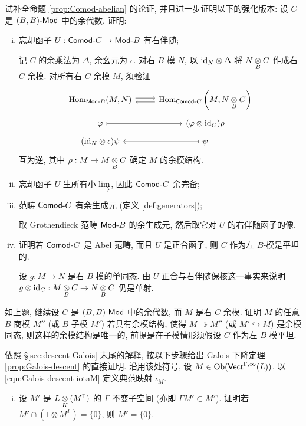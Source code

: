 \begin{Exercises}
	\item 试补全命题 \ref{prop:Comod-abelian} 的论证, 并且进一步证明以下的强化版本: 设 $C$ 是 $(B, B)\text{-}\mathsf{Mod}$ 中的余代数, 证明:
	\begin{enumerate}[(i)]
		\item 忘却函子 $U: \mathsf{Comod}\text{-}C \to \mathsf{Mod}\text{-}B$ 有右伴随;
		
		\begin{hint}
			记 $C$ 的余乘法为 $\Delta$, 余幺元为 $\epsilon$. 对右 $B$-模 $N$, 以 $\mathrm{id}_N \otimes \Delta$ 将 $N \underset{B}{\otimes} C$ 作成右 $C$-余模. 对所有右 $C$-余模 $M$, 须验证
			\[\begin{tikzcd}[row sep=tiny]
				\Hom_{\cated{Mod}B}(M, N) \arrow[shift left, r] & \Hom_{\cated{Comod}C}\left(M, N \dotimes{B} C\right) \arrow[shift left, l] \\
				\varphi \arrow[mapsto, r] & (\varphi \otimes \identity_C) \rho \\
				(\identity_N \otimes \epsilon) \psi & \psi \arrow[mapsto, l]
			\end{tikzcd}\]
			互为逆, 其中 $\rho: M \to M \underset{B}{\otimes} C$ 确定 $M$ 的余模结构.
		\end{hint}
		\item 忘却函子 $U$ 生所有小 $\varinjlim$, 因此 $\mathsf{Comod}\text{-}C$ 余完备;
		\item 范畴 $\mathsf{Comod}\text{-}C$ 有余生成元 (定义 \ref{def:generators});
		
		\begin{hint}
			取 Grothendieck 范畴 $\mathsf{Mod}\text{-}B$ 的余生成元, 然后取它对
			$U$ 的右伴随函子的像.
		\end{hint}
		\item 证明若 $\mathsf{Comod}\text{-}C$ 是 Abel 范畴, 而且 $U$ 是正合函子, 则 $C$ 作为左 $B$-模是平坦的.
		
		\begin{hint}
			设 $g: M \to N$ 是右 $B$-模的单同态. 由 $U$ 正合与右伴随保核这一事实来说明 $g \otimes \mathrm{id}_C: M \underset{B}{\otimes} C \to N \underset{B}{\otimes} C$ 仍是单射.
		\end{hint}
	\end{enumerate}

	\item 如上题, 继续设 $C$ 是 $(B, B)\text{-}\mathsf{Mod}$ 中的余代数, 而 $M$ 是右 $C$-余模. 证明 $M$ 的任意 $B$-商模 $M''$ (或 $B$-子模 $M'$) 若具有余模结构, 使得 $M \twoheadrightarrow M''$ (或 $M' \hookrightarrow M$) 是余模同态, 则这样的余模结构是唯一的, 前提是在子模情形须假设 $C$ 作为左 $B$-模平坦.

	\item 依照 \S\ref{sec:descent-Galois} 末尾的解释, 按以下步骤给出 Galois 下降定理 \ref{prop:Galois-descent} 的直接证明. 沿用该处符号, 设 $M \in \operatorname{Ob}(\mathsf{Vect}^{\Gamma, \infty}(L))$, 以 \eqref{eqn:Galois-descent-iotaM} 定义典范映射 $\iota_M$.
	\begin{enumerate}[(i)]
		\item 设 $M'$ 是 $L \underset{K}{\otimes} (M^\Gamma)$ 的 $\Gamma$-不变子空间 (亦即 $\Gamma M' \subset M'$). 证明若 $M' \cap (1 \otimes M^\Gamma) = \{0\}$, 则 $M' = \{0\}$.
		

\end{enumerate}
\end{Exercises}
